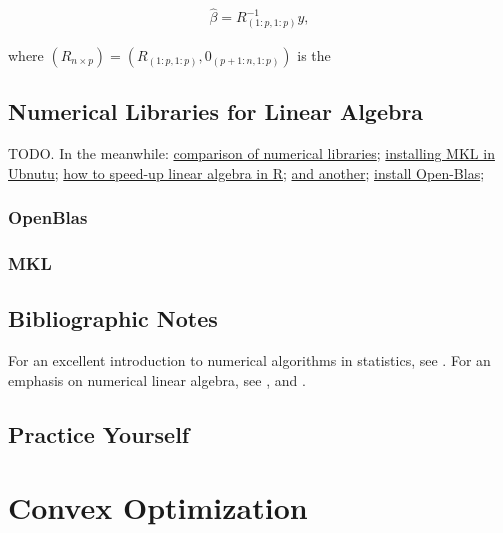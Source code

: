 \documentclass[]{book}
\theoremstyle{definition}
\theoremstyle{definition}
\theoremstyle{definition}
\theoremstyle{remark}
\begin{document}
\begin{align*}
  \hat \beta = R_{(1:p,1:p)}^{-1} y,
\end{align*}

where \((R_{n\times p})=(R_{(1:p,1:p)},0_{(p+1:n,1:p)})\) is the

\section{Numerical Libraries for Linear
Algebra}\label{numerical-libraries-for-linear-algebra}

TODO. In the meanwhile:
\href{https://en.wikipedia.org/wiki/Comparison_of_linear_algebra_libraries}{comparison
of numerical libraries};
\href{http://dirk.eddelbuettel.com/blog/2018/04/15/\#018_mkl_for_debian_ubuntu}{installing
MKL in Ubnutu};
\href{https://www.r-bloggers.com/why-is-r-slow-some-explanations-and-mklopenblas-setup-to-try-to-fix-this/}{how
to speed-up linear algebra in R};
\href{https://www.r-bloggers.com/for-faster-r-use-openblas-instead-better-than-atlas-trivial-to-switch-to-on-ubuntu/}{and
another};
\href{https://gist.github.com/pachamaltese/e4b819ccf537d465a8d49e6d60252d89}{install
Open-Blas};

\subsection{OpenBlas}\label{openblas}

\subsection{MKL}\label{mkl}

\section{Bibliographic Notes}\label{bibliographic-notes-15}

For an excellent introduction to numerical algorithms in statistics, see
\citet{weihs2013foundations}. For an emphasis on numerical linear
algebra, see \citet{gentle2012numerical}, and \citet{golub2012matrix}.

\section{Practice Yourself}\label{practice-yourself-13}

\chapter{Convex Optimization}\label{convex}
\end{document}
